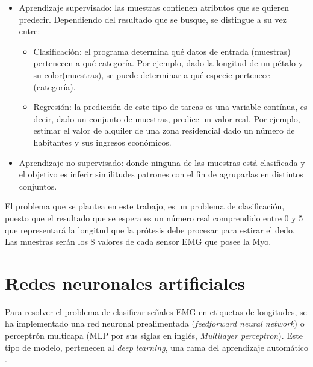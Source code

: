 \begin{itemize}
  \item Aprendizaje supervisado: las muestras contienen atributos que se
  quieren predecir. Dependiendo del resultado que se busque, se distingue
  a su vez entre:

    \begin{itemize}

      \item Clasificación: el programa determina qué datos de entrada (muestras) pertenecen a qué categoría. Por
      ejemplo, dado la longitud de un pétalo y su color(muestras), se puede determinar a qué especie pertenece
      (categoría).

      \item Regresión: la predicción de este tipo de tareas es una variable contínua, es decir, dado un conjunto
      de muestras, predice un valor real. Por ejemplo, estimar el valor de alquiler de una zona residencial dado un
      número de habitantes y sus ingresos económicos.

    \end{itemize}

    \item Aprendizaje no supervisado: donde ninguna de las muestras está clasificada y el objetivo es inferir
   similitudes patrones con el fin de agruparlas en distintos conjuntos.

\end{itemize}

El problema que se plantea en este trabajo, es un problema de clasificación,
puesto que el resultado que se espera es un número real comprendido entre 0 y 5 que representará la longitud que la
prótesis debe procesar para estirar el dedo. Las muestras serán los 8 valores de cada sensor EMG que posee la Myo.


\section{Redes neuronales artificiales}
\label{sec:redes-neuronales}
Para resolver el problema de clasificar señales EMG en etiquetas de longitudes, se ha implementado una red neuronal prealimentada (\textit{feedforward neural network}) o perceptrón multicapa (MLP por sus siglas en inglés, \textit{Multilayer perceptron}). Este tipo de modelo, pertenecen al \textit{deep learning}, una rama del aprendizaje automático \cite{Goodfellow-et-al-2016-Book}.

